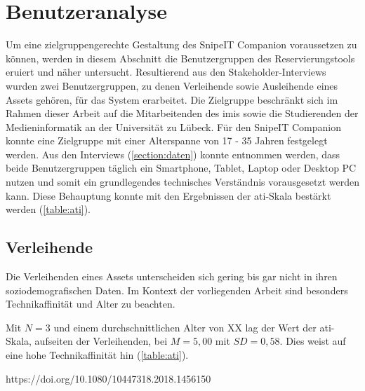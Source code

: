 \section{Benutzeranalyse}
\label{section:benutzer}
Um eine zielgruppengerechte Gestaltung des SnipeIT Companion voraussetzen zu können, werden in
diesem Abschnitt die Benutzergruppen des Reservierungstools eruiert und näher untersucht.
Resultierend aus den Stakeholder-Interviews wurden zwei Benutzergruppen, zu denen Verleihende sowie
Ausleihende eines Assets gehören, für das System erarbeitet. Die Zielgruppe beschränkt sich im
Rahmen dieser Arbeit auf die Mitarbeitenden des \ac{imis} sowie die Studierenden der
Medieninformatik an der Universität zu Lübeck. Für den SnipeIT Companion konnte eine Zielgruppe mit
einer Alterspanne von 17 - 35 Jahren festgelegt werden. Aus den Interviews (\ref{section:daten})
konnte entnommen werden, dass beide Benutzergruppen täglich ein Smartphone, Tablet, Laptop oder
Desktop PC nutzen und somit ein grundlegendes technisches Verständnis vorausgesetzt werden kann.
Diese Behauptung konnte mit den Ergebnissen der \ac{ati}-Skala bestärkt werden (\ref{table:ati}).


\subsection{Verleihende}
Die Verleihenden eines Assets unterscheiden sich gering bis gar nicht in ihren soziodemografischen
Daten. Im Kontext der vorliegenden Arbeit sind besonders Technikaffinität und Alter zu beachten.

Mit $N=3$ und einem durchschnittlichen Alter von XX lag der Wert der \ac{ati}-Skala, aufseiten der
Verleihenden, bei $M=5,00$ mit $SD=0,58$. Dies weist auf eine hohe Technikaffinität hin
(\ref{table:ati}).

\cite{franke_personal_2019}
https://doi.org/10.1080/10447318.2018.1456150 

